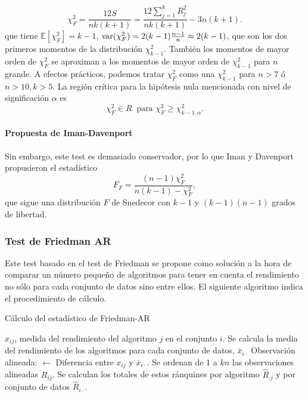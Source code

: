 	\[ \chi^2_F = \frac{12S}{nk(k+1)} = 
	\frac{12 \sum\limits_{j=1}^k R_j^2}{nk(k+1)} -3n(k+1) .
	\]
	que tiene $\mathbb{E}[\chi^2_F] = k-1$, $\text{var}(\chi^2_F)= 2(k-1)
\frac{n-1}{n} \approx 2(k-1)$, que son los dos primeros 
momentos de la distribución $\chi^2_{k-1}$. También los 
momentos de mayor orden de $\chi^2_F$ se aproximan a los 
momentos de mayor orden de $\chi^2_{k-1}$ para $n$ grande. A 
efectos prácticos, podemos tratar $\chi^2_F$ como una $
\chi^2_{k-1}$ para $n>7$ ó $n>10, k>5$. La región crítica 
para la hipótesis nula mencionada con nivel de significación 
$\alpha$ es
	\[ 
		\chi^2_F \in R \ \text{ para } 
			\chi^2_F \geq \chi_{k-1,\alpha}^2 .
	\]
	
\paragraph{Propuesta de Iman-Davenport} Sin embargo, este
test es demasiado conservador, por lo que Iman y Davenport
propusieron el estadístico
	\[
		F_F = \frac{(n-1)\chi^2_F}{n(k-1) - \chi^2_F},
	\]
	que sigue una distribución $F$ de Snedecor con $k-1$ y
$(k-1)(n-1)$ grados de libertad.
	
	
\subsubsection{Test de Friedman AR}
	Este test basado en el test de Friedman se propone como
solución a la hora de comparar un número pequeño de 
algoritmos para tener en cuenta el rendimiento no sólo 
para cada conjunto de datos sino entre ellos. El
siguiente algoritmo indica el procedimiento de cálculo.\\
	
\begin{algorithm}
	\caption{Cálculo del estadístico de Friedman-AR}
	\label{alg:Friedman-AR}
	\begin{algorithmic}[1]
	\REQUIRE $x_{ij}$, medida del rendimiento del
			algoritmo $j$ en el conjunto $i$.
	\STATE Se calcula la media del rendimiento de los 
		algoritmos para cada conjunto de datos, 
		$\bar{x}_{i \cdot}$
		\STATE Observación alineada: $\leftarrow$
			Diferencia entre $x_{ij}$ y $\bar{x}_{i \cdot}$.	
	\ENDFOR
	\STATE Se ordenan de $1$ a $kn$ las observaciones 
		alineadas $R_{ij}$.
	\STATE Se calculan los totales de estos ránquines
		por algoritmo $\hat{R}_{\cdot j}$ y por
		conjunto de datos $\hat{R}_{i \cdot}$.
	\end{algorithmic}
\end{algorithm} 

